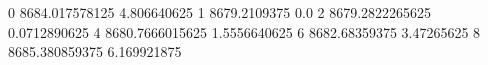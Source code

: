 0 8684.017578125 4.806640625
1 8679.2109375 0.0
2 8679.2822265625 0.0712890625
4 8680.7666015625 1.5556640625
6 8682.68359375 3.47265625
8 8685.380859375 6.169921875
